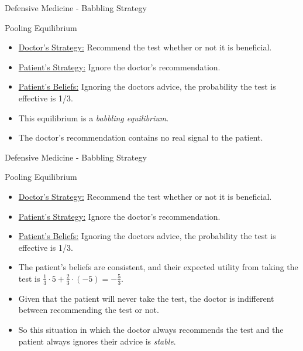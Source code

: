 \begin{frame}{Defensive Medicine - Babbling Strategy}
  \begin{block}{Pooling Equilibrium}
    \begin{itemize}
      \item \underline{Doctor's Strategy:}
      Recommend the test whether or not it is beneficial.
      \item \underline{Patient's Strategy:}
      Ignore the doctor's recommendation.
      \item \underline{Patient's Beliefs:}
      Ignoring the doctors advice,
      the probability the test is effective is 1/3.
    \end{itemize} 
  \end{block}
  \begin{itemize}
    \item This equilibrium is a \textit{babbling equilibrium}.
    \item The doctor's recommendation contains no real signal to the patient.
  \end{itemize}
\end{frame}


\begin{frame}{Defensive Medicine - Babbling Strategy}
  \begin{block}{Pooling Equilibrium}
    \begin{itemize}
      \item \underline{Doctor's Strategy:}
      Recommend the test whether or not it is beneficial.
      \item \underline{Patient's Strategy:}
      Ignore the doctor's recommendation.
      \item \underline{Patient's Beliefs:}
      Ignoring the doctors advice,
      the probability the test is effective is 1/3.
    \end{itemize} 
  \end{block}
  \begin{itemize}
    \item The patient's beliefs are consistent, 
    and their expected utility from taking the test
    is $\frac{1}{3} \cdot 5 + \frac{2}{3} \cdot (-5) = - \frac{5}{3}$.
    \item Given that the patient will never take the test, 
    the doctor is indifferent between recommending the test or not.
    \item So this situation in which the doctor always recommends the test
    and the patient always ignores their advice is \textit{stable}.
  \end{itemize}
\end{frame}

